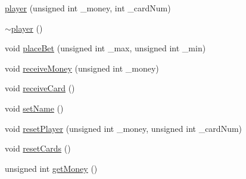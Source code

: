 \begin{DoxyCompactItemize}
\hyperlink{classplayer_a15b165c190c8b662950c3b1ecc8c43ab}{player} (unsigned int \-\_\-money, int \-\_\-card\-Num)
\item 
\hyperlink{classplayer_aab5d2e47b80e0481f09ca0df8b823057}{$\sim$player} ()
\item 
void \hyperlink{classplayer_ae4fa4a7b873325346863fb72fdfa652e}{place\-Bet} (unsigned int \-\_\-max, unsigned int \-\_\-min)
\item 
void \hyperlink{classplayer_a12b2974d663b2162b4e945b558caba3d}{receive\-Money} (unsigned int \-\_\-money)
\item 
void \hyperlink{classplayer_a08ecc20d3492b7510971b49793425138}{receive\-Card} ()
\item 
void \hyperlink{classplayer_aa0c13334b1c7bdea35078918fb3198e5}{set\-Name} ()
\item 
void \hyperlink{classplayer_a2bfb70686012dcb697113bd2fe8abe0b}{reset\-Player} (unsigned int \-\_\-money, unsigned int \-\_\-card\-Num)
\item 
void \hyperlink{classplayer_aa1f3e7d1db58e0756f36ed2e8a888569}{reset\-Cards} ()
\item 
unsigned int \hyperlink{classplayer_a6687f17d310e6d5c78639e633059e11a}{get\-Money} ()
\end{DoxyCompactItemize}
